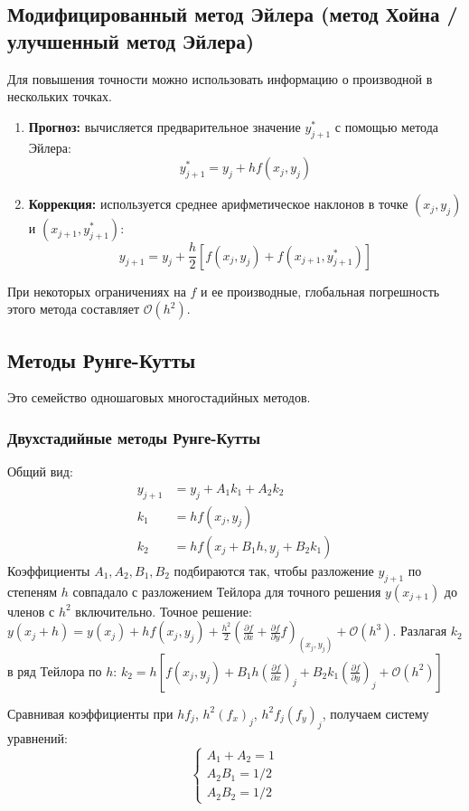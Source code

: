 \subsection{Модифицированный метод Эйлера (метод Хойна / улучшенный метод Эйлера)}
Для повышения точности можно использовать информацию о производной в нескольких точках.
\begin{enumerate}
    \item \textbf{Прогноз:} вычисляется предварительное значение $y_{j+1}^*$ с помощью метода Эйлера:
    \[ y_{j+1}^* = y_j + h f(x_j, y_j) \]
    \item \textbf{Коррекция:} используется среднее арифметическое наклонов в точке $(x_j,y_j)$ и $(x_{j+1}, y_{j+1}^*)$:
    \[ y_{j+1} = y_j + \frac{h}{2} [f(x_j, y_j) + f(x_{j+1}, y_{j+1}^*)] \]
\end{enumerate}
При некоторых ограничениях на $f$ и ее производные, глобальная погрешность этого метода составляет $\mathcal{O}(h^2)$.

\subsection{Методы Рунге-Кутты}
Это семейство одношаговых многостадийных методов.
\subsubsection{Двухстадийные методы Рунге-Кутты}
Общий вид:
\begin{align*} y_{j+1} &= y_j + A_1 k_1 + A_2 k_2 \\ k_1 &= h f(x_j, y_j) \\ k_2 &= h f(x_j + B_1 h, y_j + B_2 k_1) \end{align*}
Коэффициенты $A_1, A_2, B_1, B_2$ подбираются так, чтобы разложение $y_{j+1}$ по степеням $h$ совпадало с разложением Тейлора для точного решения $y(x_{j+1})$ до членов с $h^2$ включительно.
Точное решение: $y(x_j+h) = y(x_j) + h f(x_j,y_j) + \frac{h^2}{2} \left( \frac{\partial f}{\partial x} + \frac{\partial f}{\partial y} f \right)_{ (x_j,y_j) } + \mathcal{O}(h^3)$.
Разлагая $k_2$ в ряд Тейлора по $h$:
$k_2 = h \left[ f(x_j,y_j) + B_1 h \left(\frac{\partial f}{\partial x}\right)_j + B_2 k_1 \left(\frac{\partial f}{\partial y}\right)_j + \mathcal{O}(h^2) \right]$

Сравнивая коэффициенты при $h f_j$, $h^2 (f_x)_j$, $h^2 f_j (f_y)_j$, получаем систему уравнений:
\[ \begin{cases} A_1 + A_2 = 1 \\ A_2 B_1 = 1/2 \\ A_2 B_2 = 1/2 \end{cases} \]

